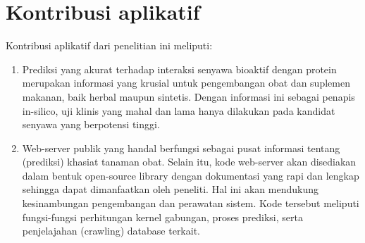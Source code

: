 \section{Kontribusi aplikatif}
Kontribusi aplikatif dari penelitian ini meliputi:

\begin{enumerate} [topsep=0mm]
\itemsep0mm
\item
Prediksi yang akurat terhadap interaksi senyawa bioaktif dengan protein merupakan informasi yang krusial untuk pengembangan obat dan suplemen makanan, baik herbal maupun sintetis.
Dengan informasi ini sebagai penapis in-silico, uji klinis yang mahal dan lama hanya dilakukan pada kandidat senyawa yang berpotensi tinggi.

\item
Web-server publik yang handal berfungsi sebagai pusat informasi tentang (prediksi) khasiat tanaman obat.
Selain itu, kode web-server akan disediakan dalam bentuk open-source library dengan dokumentasi yang rapi dan lengkap sehingga dapat dimanfaatkan oleh peneliti.
Hal ini akan mendukung kesinambungan pengembangan dan perawatan sistem.
Kode tersebut meliputi fungsi-fungsi perhitungan kernel gabungan, proses prediksi, serta penjelajahan (crawling) database terkait.
\end{enumerate}



